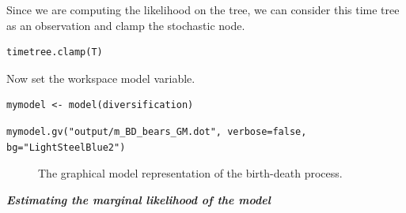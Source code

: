 Since we are computing the likelihood on the \citet{dosReis2012} tree, we can consider this time tree as an observation and clamp the stochastic node.
{\tt \begin{snugshade*}
\begin{lstlisting}
timetree.clamp(T)
\end{lstlisting}
\end{snugshade*}}

Now set the workspace model variable.
{\tt \begin{snugshade*}
\begin{lstlisting}
mymodel <- model(diversification)
\end{lstlisting}
\end{snugshade*}}

{\tt \begin{snugshade*}
\begin{lstlisting}
mymodel.gv("output/m_BD_bears_GM.dot", verbose=false, bg="LightSteelBlue2")
\end{lstlisting}
\end{snugshade*}}

\begin{figure}[h!]
\centering
{}
\caption{\small The graphical model representation of the birth-death process.}
\label{BDGMGVfig}
\end{figure}



\textbf{\textit{Estimating the marginal likelihood of the model}}


